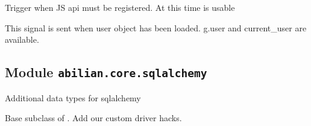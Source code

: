 \documentclass[a4paper,12pt,english]{sphinxmanual}
\begin{document}

\begin{fulllineitems}
\label{api:abilian.core.signals.register_js_api}
Trigger when JS api must be registered. At this time \href{http://flask.pocoo.org/docs/api/\#flask.url\_for}{} is
usable

\end{fulllineitems}


\begin{fulllineitems}
\label{api:abilian.core.signals.user_loaded}
This signal is sent when user object has been loaded. g.user and current\_user
are available.

\end{fulllineitems}



\subsection{Module \texttt{abilian.core.sqlalchemy}}
\label{api:module-abilian.core.sqlalchemy}\label{api:module-abilian-core-sqlalchemy}
Additional data types for sqlalchemy

\begin{fulllineitems}
\label{api:abilian.core.sqlalchemy.AbilianBaseSAExtension}
Base subclass of . Add
our custom driver hacks.

\begin{fulllineitems}
\label{api:abilian.core.sqlalchemy.AbilianBaseSAExtension.apply_driver_hacks}
\end{fulllineitems}


\end{fulllineitems}
\end{document}
